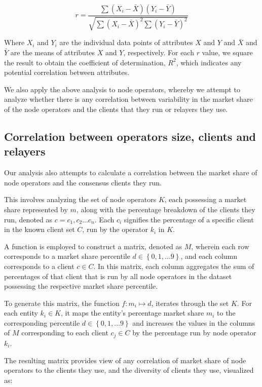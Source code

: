 \documentclass[conference]{IEEEtran}
\begin{document}
\[
r = \frac{\sum{(X_i - \bar{X})(Y_i - \bar{Y})}}{\sqrt{\sum{(X_i - \bar{X})^2}\sum{(Y_i - \bar{Y})^2}}}
\]

\vspace{3pt}

Where $X_i$ and $Y_i$ are the individual data points of attributes $X$ and $Y$ and $\bar{X}$ and $\bar{Y}$ are the means of attributes $X$ and $Y$, respectively.  For each $r$ value, we square the result to obtain the coefficient of determination, $R^2$, which indicates any potential correlation between attributes.

We also apply the above analysis to node operators, whereby we attempt to analyze whether there is any correlation between variability in the market share of the node operators and the clients that they run or relayers they use.

\subsection{Correlation between operators size, clients and relayers}

Our analysis also attempts to calculate a correlation between the market share of node operators and the consensus clients they run.

This  involves analyzing the set of node operators $K$, each possessing a market share represented by $m$, along with the percentage breakdown of the clients they run, denoted as $c = { c_1, c_2 . . . c_n }$. Each $c_i$ signifies the percentage of a specific client in the known client set $C$, run by the operator $k_i$ in $K$.

A function is employed to construct a matrix, denoted as $M$, wherein each row corresponds to a market share percentile $d \in \left\{0, 1, ... 9\right\}$, and each column corresponds to a client $c \in C$. In this matrix, each column aggregates the sum of percentages of that client that is run by all node operators in the dataset possessing the respective market share percentile.

To generate this matrix, the function $f: m_i \mapsto d$, iterates through the set $K$. For each entity $k_i \in K$, it maps the entity's percentage market share $m_i$ to the corresponding percentile $d \in \left\{0, 1, ... 9\right\}$ and increases the values in the columns of $M$ corresponding to each client $c_j \in C$ by the percentage run by node operator $k_i$.

The resulting matrix provides view of any correlation of market share of node operators to the clients they use, and the diversity of clients they use, visualized as:
\end{document}
